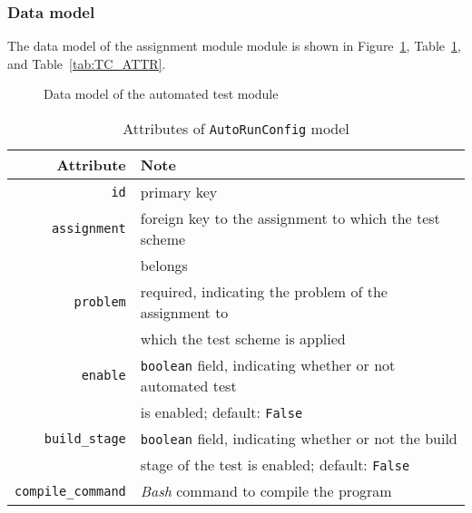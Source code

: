 \subsubsection{Data model}
The data model of the assignment module module is shown in
Figure~\ref{fig:AUTO_ER}, Table~\ref{tab:AUTO_ATTR},
and Table~\ref{tab:TC_ATTR}. \bigskip

\begin{figure}[H]
    \centering
    \caption{Data model of the automated test module}
    \label{fig:AUTO_ER}
    \usetikzlibrary{er}

\end{figure}

\begin{table}[h]
    \centering
    \caption{Attributes of \texttt{AutoRunConfig} model}
    \label{tab:AUTO_ATTR}
    \renewcommand{\arraystretch}{1.3}
    \begin{tabular}[H]{r|l}
        \hline
        Attribute & Note \\
        \hline
        \hline

        \texttt{id} & primary key \\
        \hline
        \texttt{assignment} & foreign key to the assignment to which the test
            scheme \\ & belongs \\
        \hline
        \hline

        \texttt{problem} & required, indicating the problem of the assignment to
            \\ & which the test scheme is applied \\
        \hline
        \texttt{enable} & \texttt{boolean} field, indicating whether or not automated test \\
            & is enabled; default: \texttt{False} \\
        \hline
        \texttt{build\_stage} & \texttt{boolean} field, indicating whether or not the build \\
            & stage of the test is enabled; default: \texttt{False} \\
        \hline
        \texttt{compile\_command} & \emph{Bash} command to compile the program \\
        \hline
    \end{tabular}
    \renewcommand{\arraystretch}{1}
\end{table}

